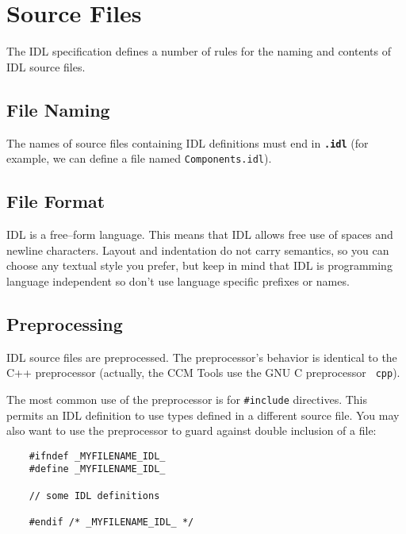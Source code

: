 \section{Source Files}
The IDL specification defines a number of rules for the naming and contents of
IDL source files.

\subsection{File Naming}
The names of source files containing IDL definitions must end in {\bf \tt .idl}
(for example, we can define a file named {\tt Components.idl}).

\subsection{File Format}
IDL is a free--form language. This means that IDL allows free use of spaces
and newline characters.
Layout and indentation do not carry semantics, so you can choose any textual
style you prefer, but keep in mind that IDL is programming language independent
so don't use language specific prefixes or names.
 

\subsection{Preprocessing}
IDL source files are preprocessed. The preprocessor's behavior is identical to
the C++ preprocessor (actually, the CCM Tools use the GNU C preprocessor {\tt 
cpp}).

The most common use of the preprocessor is for {\tt \#include} directives. This
permits an IDL definition to use types defined in a different source file.
You may also want to use the preprocessor to guard against double inclusion of a
file:
\begin{verbatim}
    #ifndef _MYFILENAME_IDL_
    #define _MYFILENAME_IDL_
    
    // some IDL definitions

    #endif /* _MYFILENAME_IDL_ */
\end{verbatim}


